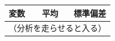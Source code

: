 \begin{tabular}{lrr}
\toprule
\textbf{変数} & \textbf{平均} & \textbf{標準偏差} \\
\midrule
\multicolumn{3}{c}{（分析を走らせると入る）} \\
\bottomrule
\end{tabular}
